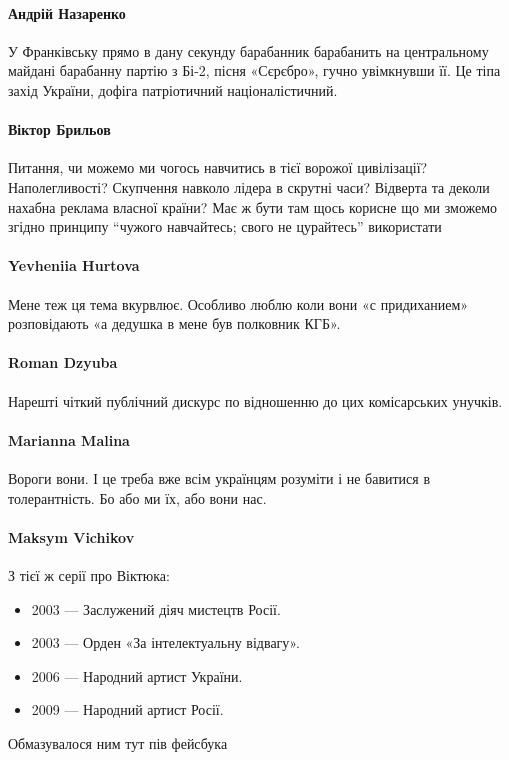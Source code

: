 \paragraph{Андрій Назаренко}
У Франківську прямо в дану секунду барабанник барабанить на центральному
майдані барабанну партію з Бі-2, пісня «Сєрєбро», гучно увімкнувши її. Це тіпа
захід України, дофіга патріотичний націоналістичний. 

\paragraph{Віктор Брильов}

Питання, чи можемо ми чогось навчитись в тієї ворожої цивілізації?
Наполегливості? Скупчення навколо лідера в скрутні часи? Відверта та деколи
нахабна реклама власної країни? Має ж бути там щось корисне що ми зможемо
згідно принципу \enquote{чужого навчайтесь; свого не цурайтесь} використати

\paragraph{Yevheniia Hurtova}
Мене теж ця тема вкурвлює. Особливо люблю коли вони «с придиханием»
розповідають «а дедушка в мене був полковник КГБ». 

\paragraph{Roman Dzyuba}
Нарешті чіткий публічний дискурс по відношенню до цих комісарських унучків.

\paragraph{Marianna Malina}
Вороги вони. І це треба вже всім українцям розуміти і не бавитися в
толерантність. Бо або ми їх, або вони нас.

\paragraph{Maksym Vichikov}

З тієї ж серії про Віктюка:
\begin{itemize}
  \item 2003 — Заслужений діяч мистецтв Росії.
  \item 2003 — Орден «За інтелектуальну відвагу».
  \item 2006 — Народний артист України.
  \item 2009 — Народний артист Росії.
\end{itemize}
Обмазувалося ним тут пів фейсбука

